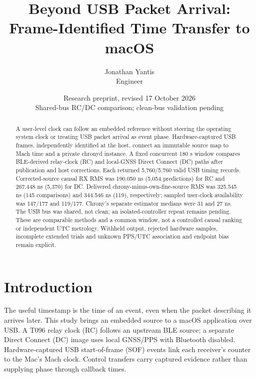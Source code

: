 \documentclass[11pt,letterpaper]{article}
\begin{document}
\title{\vspace{-1.4em}Beyond USB Packet Arrival:\\Frame-Identified Time Transfer to macOS}
\author{Jonathan Yantis\\\small Engineer}
\date{Research preprint, revised 17 October 2026\\\small Shared-bus RC/DC comparison; clean-bus validation pending}
\maketitle
\begin{abstract}
A user-level clock can follow an embedded reference without steering the operating system clock or treating USB packet arrival as event phase. Hardware-captured USB frames, independently identified at the host, connect an immutable source map to Mach time and a private chronyd instance. A fixed concurrent 180 s window compares BLE-derived relay-clock (RC) and local-GNSS Direct Connect (DC) paths after publication and host corrections. Each returned 5,760/5,760 valid USB timing records. Corrected-source causal RX RMS was 190.050 ns (5,054 predictions) for RC and 267.448 ns (5,370) for DC. Delivered chrony-minus-own-fine-source RMS was 325.545 ns (145 comparisons) and 344.546 ns (119), respectively; sampled user-clock availability was 147/177 and 119/177. Chrony's separate estimator medians were 31 and 27 ns. The USB bus was shared, not clean; an isolated-controller repeat remains pending. These are comparable methods and a common window, not a controlled causal ranking or independent UTC metrology. Withheld output, rejected hardware samples, incomplete extended trials and unknown PPS/UTC association and endpoint bias remain explicit.
\end{abstract}

\section{Introduction}
The useful timestamp is the time of an event, even when the packet describing it arrives later. This study brings an embedded source to a macOS application over USB. A T096 relay clock (RC) follows an upstream BLE source; a separate Direct Connect (DC) image uses local GNSS/PPS with Bluetooth disabled. Hardware-captured USB start-of-frame (SOF) events link each receiver's counter to the Mac's Mach clock. Control transfers carry captured evidence rather than supplying phase through callback times.
\end{document}
